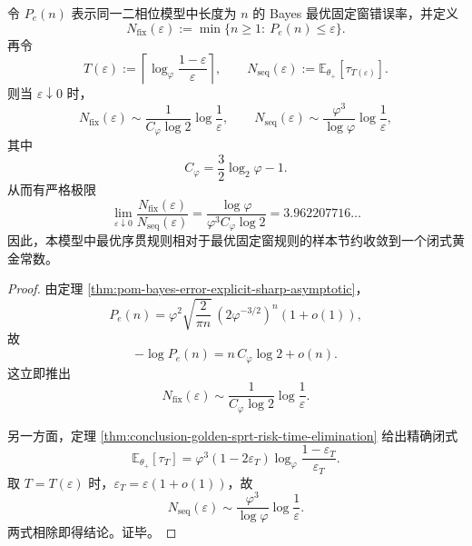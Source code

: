 \begin{corollary}[固定窗与序贯窗样本复杂度的黄金分离常数]\label{cor:conclusion-golden-sprt-fixed-sequential-sample-separation}
令 \(P_e(n)\) 表示同一二相位模型中长度为 \(n\) 的 Bayes 最优固定窗错误率，并定义
\[
N_{\mathrm{fix}}(\varepsilon):=\min\{n\ge 1:\ P_e(n)\le \varepsilon\}.
\]
再令
\[
T(\varepsilon):=
\left\lceil
\log_\varphi\frac{1-\varepsilon}{\varepsilon}
\right\rceil,
\qquad
N_{\mathrm{seq}}(\varepsilon):=\mathbb E_{\theta_+}[\tau_{T(\varepsilon)}].
\]
则当 \(\varepsilon\downarrow0\) 时，
\[
N_{\mathrm{fix}}(\varepsilon)
\sim
\frac{1}{C_\varphi\log 2}\log\frac1\varepsilon,
\qquad
N_{\mathrm{seq}}(\varepsilon)
\sim
\frac{\varphi^3}{\log\varphi}\log\frac1\varepsilon,
\]
其中
\[
C_\varphi=\frac32\log_2\varphi-1.
\]
从而有严格极限
\[
\boxed{\;
\lim_{\varepsilon\downarrow0}
\frac{N_{\mathrm{fix}}(\varepsilon)}{N_{\mathrm{seq}}(\varepsilon)}
=
\frac{\log\varphi}{\varphi^3 C_\varphi\log 2}
=
3.962207716\ldots
\;}
\]
因此，本模型中最优序贯规则相对于最优固定窗规则的样本节约收敛到一个闭式黄金常数。
\end{corollary}
\begin{proof}
由定理 \ref{thm:pom-bayes-error-explicit-sharp-asymptotic}，
\[
P_e(n)=\varphi^2\sqrt{\frac{2}{\pi n}}\,(2\varphi^{-3/2})^n(1+o(1)),
\]
故
\[
-\log P_e(n)
=
n\,C_\varphi\log 2+o(n).
\]
这立即推出
\[
N_{\mathrm{fix}}(\varepsilon)
\sim
\frac{1}{C_\varphi\log 2}\log\frac1\varepsilon.
\]

另一方面，定理 \ref{thm:conclusion-golden-sprt-risk-time-elimination} 给出精确闭式
\[
\mathbb E_{\theta_+}[\tau_T]
=
\varphi^3(1-2\varepsilon_T)
\log_\varphi\frac{1-\varepsilon_T}{\varepsilon_T}.
\]
取 \(T=T(\varepsilon)\) 时，\(\varepsilon_T=\varepsilon(1+o(1))\)，故
\[
N_{\mathrm{seq}}(\varepsilon)
\sim
\frac{\varphi^3}{\log\varphi}\log\frac1\varepsilon.
\]
两式相除即得结论。证毕。
\end{proof}

